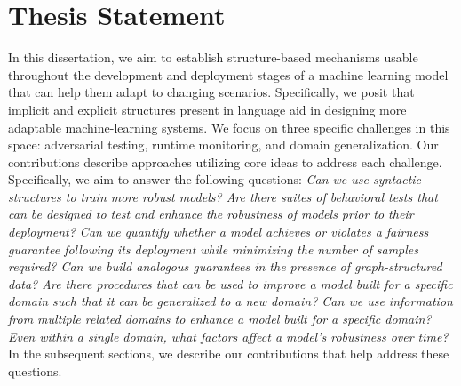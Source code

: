 


\section{Thesis Statement}
In this dissertation, we aim to establish structure-based mechanisms usable throughout the development and deployment stages of a machine learning model that can help them adapt to changing scenarios. 
Specifically, we posit that implicit and explicit structures present in language aid in designing more adaptable machine-learning systems.
We focus on three specific challenges in this space: adversarial testing, runtime monitoring, and domain generalization.
Our contributions describe approaches utilizing core ideas to address each challenge.
Specifically, we aim to answer the following questions: 
\emph{Can we use syntactic structures to train more robust models?
Are there suites of behavioral tests that can be designed to test and enhance the robustness of models prior to their deployment?
Can we quantify whether a model achieves or violates a fairness guarantee following its deployment while minimizing the number of samples required?
Can we build analogous guarantees in the presence of graph-structured data?
Are there procedures that can be used to improve a model built for a specific domain such that it can be generalized to a new domain?
Can we use information from multiple related domains to enhance a model built for a specific domain?
Even within a single domain, what factors affect a model's robustness over time?}
In the subsequent sections, we describe our contributions that help address these questions.


